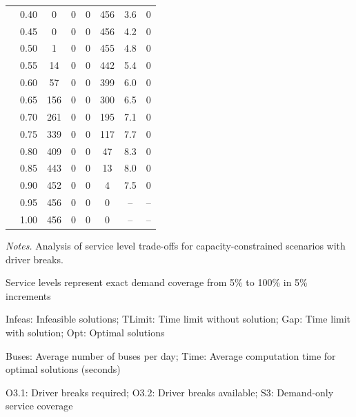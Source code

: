 \begin{table}[ht]
\begin{threeparttable}
\begin{tabular}{llcccccc}
 & 0.40 & 0 & 0 & 0 & 456 & 3.6 & 0 \\
 & 0.45 & 0 & 0 & 0 & 456 & 4.2 & 0 \\
 & 0.50 & 1 & 0 & 0 & 455 & 4.8 & 0 \\
 & 0.55 & 14 & 0 & 0 & 442 & 5.4 & 0 \\
 & 0.60 & 57 & 0 & 0 & 399 & 6.0 & 0 \\
 & 0.65 & 156 & 0 & 0 & 300 & 6.5 & 0 \\
 & 0.70 & 261 & 0 & 0 & 195 & 7.1 & 0 \\
 & 0.75 & 339 & 0 & 0 & 117 & 7.7 & 0 \\
 & 0.80 & 409 & 0 & 0 & 47 & 8.3 & 0 \\
 & 0.85 & 443 & 0 & 0 & 13 & 8.0 & 0 \\
 & 0.90 & 452 & 0 & 0 & 4 & 7.5 & 0 \\
 & 0.95 & 456 & 0 & 0 & 0 & -- & -- \\
 & 1.00 & 456 & 0 & 0 & 0 & -- & -- \\
\bottomrule
\end{tabular}
\begin{tablenotes}
      \smaller
      \item \textit{Notes.} Analysis of service level trade-offs for capacity-constrained scenarios with driver breaks.
      \item Service levels represent exact demand coverage from 5\% to 100\% in 5\% increments
      \item Infeas: Infeasible solutions; TLimit: Time limit without solution; Gap: Time limit with solution; Opt: Optimal solutions
      \item Buses: Average number of buses per day; Time: Average computation time for optimal solutions (seconds)
      \item O3.1: Driver breaks required; O3.2: Driver breaks available; S3: Demand-only service coverage
\end{tablenotes}
\end{threeparttable}
\end{table}
